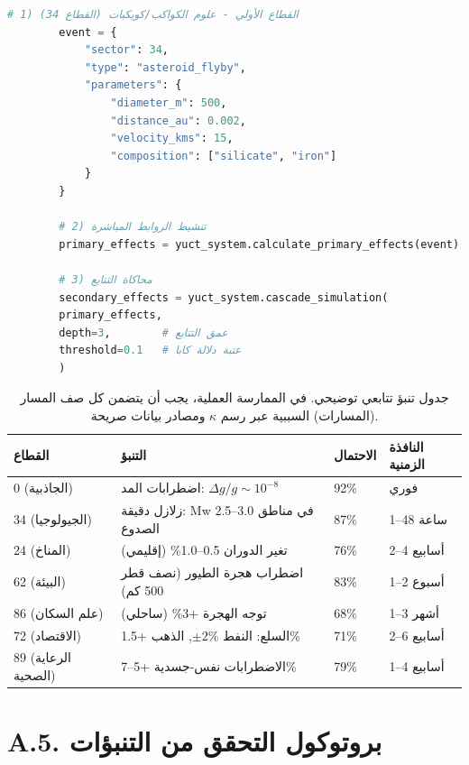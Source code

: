 \documentclass[13pt,a4paper]{article}
\begin{document}
	\begin{lstlisting}[language=Python]
		# 1) القطاع الأولي - علوم الكواكب/كويكبات (القطاع 34)
		event = {
			"sector": 34,
			"type": "asteroid_flyby",
			"parameters": {
				"diameter_m": 500,
				"distance_au": 0.002,
				"velocity_kms": 15,
				"composition": ["silicate", "iron"]
			}
		}
		
		# 2) تنشيط الروابط المباشرة
		primary_effects = yuct_system.calculate_primary_effects(event)
		
		# 3) محاكاة التتابع
		secondary_effects = yuct_system.cascade_simulation(
		primary_effects,
		depth=3,        # عمق التتابع
		threshold=0.1   # عتبة دلالة كابا
		)
	\end{lstlisting}
	
	\begin{table}[htbp]
		\centering
		\small
		\begin{tabular}{p{}p{}p{}p{}}
			\toprule
			\textbf{القطاع} & \textbf{التنبؤ} & \textbf{الاحتمال} & \textbf{النافذة الزمنية} \\
			\midrule
			0 (الجاذبية) & اضطرابات المد: $\Delta g/g \sim 10^{-8}$ & 92\% & فوري \\
			34 (الجيولوجيا) & زلازل دقيقة: Mw 2.5--3.0 في مناطق الصدوع & 87\% & 1--48 ساعة \\
			24 (المناخ) & تغير الدوران 0.5--1.0\% (إقليمي) & 76\% & 2--4 أسابيع \\
			62 (البيئة) & اضطراب هجرة الطيور (نصف قطر 500 كم) & 83\% & 1--2 أسبوع \\
			86 (علم السكان) & توجه الهجرة +3\% (ساحلي) & 68\% & 1--3 أشهر \\
			72 (الاقتصاد) & السلع: النفط $\pm 2\%$, الذهب +1.5\% & 71\% & 2--6 أسابيع \\
			89 (الرعاية الصحية) & الاضطرابات نفس-جسدية +5--7\% & 79\% & 1--4 أسابيع \\
			\bottomrule
		\end{tabular}
		\caption{جدول تنبؤ تتابعي توضيحي. في الممارسة العملية، يجب أن يتضمن كل صف المسار (المسارات) السببية عبر رسم $\kappa$ ومصادر بيانات صريحة.}
	\end{table}
	
	\section*{A.5. بروتوكول التحقق من التنبؤات}
	
\end{document}

